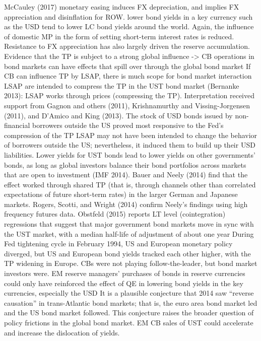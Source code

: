 McCauley (2017)
monetary easing induces FX depreciation, and implies FX appreciation and disinflation for ROW.
lower bond yields in a key currency such as the USD tend to lower LC bond yields around the world. Again, the influence of domestic MP in the form of setting short-term interest rates is reduced.
Resistance to FX appreciation has also largely driven the reserve accumulation.
Evidence that the TP is subject to a strong global influence -> CB operations in bond markets can have effects that spill over through the global bond market
If CB can influence TP by LSAP, there is much scope for bond market interaction
LSAP are intended to compress the TP in the UST bond market (Bernanke 2013): LSAP works through prices (compressing the TP). Interpretation received support from Gagnon and others (2011), Krishnamurthy and Vissing-Jorgensen (2011), and D’Amico and King (2013).
The stock of USD bonds issued by non-financial borrowers outside the US proved most responsive to the Fed’s compression of the TP
LSAP may not have been intended to change the behavior of borrowers outside
the US; nevertheless, it induced them to build up their USD liabilities. 
Lower yields for UST bonds lead to lower yields on other governments’ bonds, as long as global investors balance their bond portfolios across markets that are open to
investment (IMF 2014).
Bauer and Neely (2014) find that the effect worked through shared TP (that is, through channels other than correlated expectations of future short-term rates) in the larger German and Japanese markets. Rogers, Scotti, and Wright (2014) confirm Neely’s findings using high frequency futures data.
Obstfeld (2015) reports LT level (cointegration) regressions that suggest that major government bond markets move in sync with the UST market, with a median half-life of adjustment of about one year
During Fed tightening cycle in February 1994, US and European monetary policy diverged, but US and European bond yields tracked each other higher, with the TP widening in Europe. CBs were not playing follow-the-leader, but bond market investors were. 
EM reserve managers’ purchases of bonds in reserve currencies could only have reinforced the effect of QE in lowering bond yields in the key currencies, especially the USD
It is a plausible conjecture that 2014 saw “reverse causation” in trans-Atlantic bond markets; that is, the euro area bond market led and the US bond market followed. This conjecture raises the broader question of policy frictions in the global bond market.
EM CB sales of UST could accelerate and increase the dislocation of yields. 


